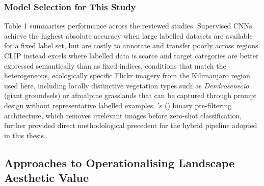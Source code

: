 \documentclass[hidelinks, 11pt]{article}
\begin{document}
\subsubsection{Model Selection for This Study}
Table 1 summarises performance across the reviewed studies. Supervised CNNs achieve the highest absolute accuracy when large labelled datasets are available for a fixed label set, but are costly to annotate and transfer poorly across regions. CLIP instead excels where labelled data is scarce and target categories are better expressed semantically than as fixed indices, conditions that match the heterogeneous, ecologically specific Flickr imagery from the Kilimanjaro region used here, including locally distinctive vegetation types such as \textit{Dendrosenecio} (giant groundsels) or afroalpine grasslands that can be captured through prompt design without representative labelled examples. \citeauthor{liao_mapping_2025}'s (\citeyear{liao_mapping_2025}) binary pre-filtering architecture, which removes irrelevant images before zero-shot classification, further provided direct methodological precedent for the hybrid pipeline adopted in this thesis.



\subsection{Approaches to Operationalising Landscape Aesthetic Value}
\end{document}
